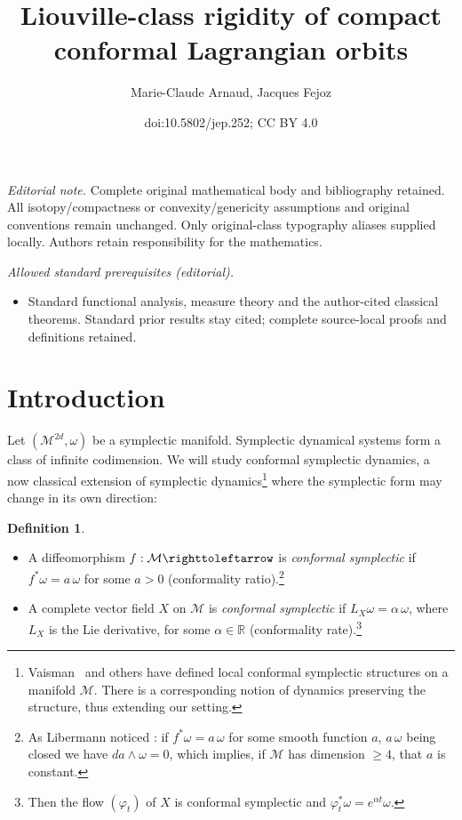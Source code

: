 \documentclass[10pt]{amsart}
\title{Liouville-class rigidity of compact conformal Lagrangian orbits}
\author{Marie-Claude Arnaud, Jacques Fejoz}
\date{doi:10.5802/jep.252; CC BY 4.0}
\theoremstyle{definition}
\newtheorem{definition}[theorem]{Definition}
\def\R{\mathbb{R}}
\def\cM{{\mathcal M}}
\providecommand{\skpt}{\par\smallskip\noindent}
\providecommand{\mainmatter}{}\providecommand{\backmatter}{}
\begin{document}
\maketitle
\noindent\textit{Editorial note.} Complete original mathematical body and bibliography retained. All isotopy/compactness or convexity/genericity assumptions and original conventions remain unchanged. Only original-class typography aliases supplied locally. Authors retain responsibility for the mathematics.\par\medskip
\noindent\textit{Allowed standard prerequisites (editorial).}\begin{itemize}
\item Standard functional analysis, measure theory and the author-cited classical theorems. Standard prior results stay cited; complete source-local proofs and definitions retained.
\end{itemize}\medskip
\vspace*{-\baselineskip}
\tableofcontents
\mainmatter
\section{Introduction} \label{SecShortIntro}

Let $(\cM^{2d}, \omega)$ be a symplectic manifold. Symplectic dynamical systems form a class of infinite codimension. We will study conformal symplectic dynamics, a now classical extension of symplectic dynamics\footnote{Vaisman~\cite{Vaisman1985} and others have defined local conformal symplectic structures on a manifold $\cM$. There is a corresponding notion of dynamics preserving the structure, thus extending our setting.} where the symplectic form may change in its own direction:

\skpt
\begin{definition}
\begin{itemize}
\item A diffeomorphism $f: \cM \righttoleftarrow$ is \emph{conformal symplectic} if $f^*\omega=a\, \omega$ for some $a>0$ (conformality ratio).\footnote{As Libermann noticed \cite{Lib1959}: if $f^*\omega=a\, \omega$ for some smooth function $a$, $a\,\omega$ being closed we have $da \wedge \omega = 0$, which implies, if $\cM$ has dimension $\geq 4$, that $a$ is constant.}
\item A complete vector field $X$ on $\cM$ is \emph{conformal symplectic} if $L_X\omega=\alpha\, \omega$, where $L_X$ is the Lie derivative, for some $\alpha \in \R$ (conformality rate).\footnote{Then the flow $(\varphi_t)$ of $X$ is conformal symplectic and $\varphi_t^*\omega=e^{\alpha t}\omega$.}
\end{itemize}
\end{definition}
\end{document}
